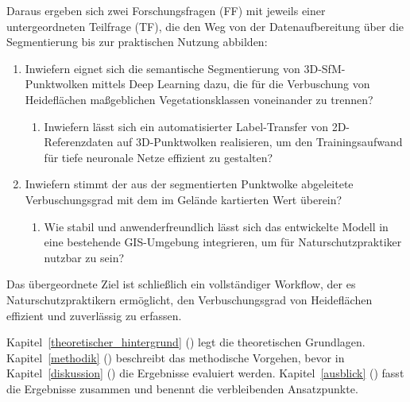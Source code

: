 Daraus ergeben sich zwei Forschungsfragen (FF) mit jeweils einer untergeordneten Teilfrage (TF), die den Weg von der Datenaufbereitung über die Segmentierung bis zur praktischen Nutzung abbilden:

\begin{enumerate}[label=\textbf{FF\arabic*:}, leftmargin=*, align=left, itemsep=6pt]
    \item Inwiefern eignet sich die semantische Segmentierung von 3D-SfM-Punktwolken mittels Deep Learning dazu, die für die Verbuschung von Heideflächen maßgeblichen Vegetationsklassen voneinander zu trennen?
    \begin{enumerate}[label=\textbf{TF\arabic{enumi}:}, leftmargin=*, align=left, topsep=4pt]
        \item Inwiefern lässt sich ein automatisierter Label-Transfer von 2D-Referenzdaten auf 3D-Punktwolken realisieren, um den Trainingsaufwand für tiefe neuronale Netze effizient zu gestalten?
    \end{enumerate}
    \item Inwiefern stimmt der aus der segmentierten Punktwolke abgeleitete Verbuschungsgrad mit dem im Gelände kartierten Wert überein?
    \begin{enumerate}[label=\textbf{TF\arabic{enumi}:}, leftmargin=*, align=left, topsep=4pt]
        \item Wie stabil und anwenderfreundlich lässt sich das entwickelte Modell in eine bestehende GIS-Umgebung integrieren, um für Naturschutzpraktiker nutzbar zu sein?
    \end{enumerate}
\end{enumerate}

Das übergeordnete Ziel ist schließlich ein vollständiger Workflow, der es Naturschutzpraktikern ermöglicht, den Verbuschungsgrad von Heideflächen effizient und zuverlässig zu erfassen.

Kapitel~\ref{theoretischer_hintergrund} ()
legt die theoretischen Grundlagen. Kapitel~\ref{methodik} () beschreibt das methodische
Vorgehen, bevor in Kapitel~\ref{diskussion}
() die Ergebnisse evaluiert werden.
Kapitel~\ref{ausblick} () fasst die Ergebnisse zusammen
und benennt die verbleibenden Ansatzpunkte.


